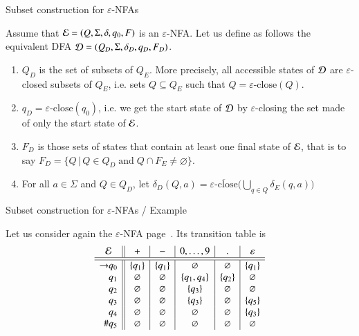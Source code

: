 \documentclass[compress,dvips,xcolor={dvipsnames},t]{beamer}
\newcommand\eNFA{\(\varepsilon\)-NFA\xspace}
\newcommand\eClose{\varepsilon\text{-close}}
\newcommand\eCloseSet{\overline{\eClose}}
\begin{document}
%
\begin{frame}{Subset construction for {\eNFA}s}

Assume that \({\cal E} = (Q, \Sigma, \delta, q_0, F)\) is an
\eNFA. Let us define as follows the equivalent DFA \({\cal D} = (Q_D,
\Sigma, \delta_D, q_D, F_D)\).
\begin{enumerate}

  \item \(Q_D\) is the set of subsets of \(Q_E\). More precisely, all
    accessible states of \(\cal D\) are \(\varepsilon\)-closed subsets of
    \(Q_E\), i.e. sets \(Q \subseteq Q_E\) such that \(Q =
    \eClose(Q)\).

  \item \(q_D = \eClose (q_0)\), i.e. we get the start state
  of \(\cal D\) by \(\varepsilon\)-closing the set made of only the start
  state of \(\cal E\).

  \item \(F_D\) is those sets of states that contain at least one
  final state of \(\cal E\), that is to say \(F_D = \{Q \, \lvert
  \, Q \in Q_D \; \text{and} \; Q \cap F_E \neq \varnothing\}\).

  \item For all \(a \in \Sigma\) and \(Q \in Q_D\), let
  \(
  \delta_D (Q, a) = \eCloseSet \biggl(\bigcup_{q \in Q}{\delta_E (q,
    a)}\biggr)
  \)

 \end{enumerate}

\end{frame}

%
\begin{frame}{Subset construction for {\eNFA}s / Example}

Let us consider again the \eNFA page~\pageref{enfa_num}. Its transition
table is
\[
\begin{array}{r@{}l||c|c|c|c|c}
\multicolumn{2}{c||}{\cal E} & + & - & 0, \ldots, 9 & \mathtt{.} &
\varepsilon\\
\hline\hline
\rightarrow & q_0 & \{q_1\} & \{q_1\} & \varnothing & \varnothing
                  & \{q_1\}\\
            & q_1 & \varnothing  & \varnothing & \{q_1, q_4\}
                  & \{q_2\} & \varnothing\\
            & q_2 & \varnothing  & \varnothing & \{q_3\} & \varnothing
                  & \varnothing\\
            & q_3 & \varnothing & \varnothing & \{q_3\} & \varnothing
                  & \{q_5\}\\
            & q_4 & \varnothing & \varnothing & \varnothing
                  & \varnothing & \{q_3\}\\
         \# & q_5 & \varnothing & \varnothing & \varnothing
                  & \varnothing & \varnothing
\end{array}
\]

\end{frame}
\end{document}
